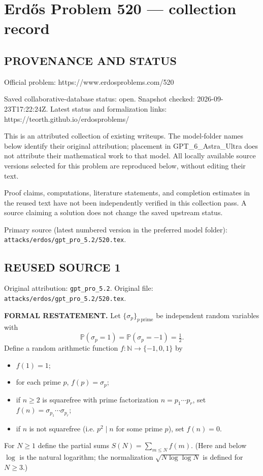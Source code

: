 \section*{Erd\H{o}s Problem 520 --- collection record}

\subsection*{PROVENANCE AND STATUS}
Official problem: https://www.erdosproblems.com/520

Saved collaborative-database status: open.
Snapshot checked: 2026-09-23T17:22:24Z.
Latest status and formalization links: https://teorth.github.io/erdosproblems/

This is an attributed collection of existing writeups. The model-folder names below identify their original attribution; placement in GPT\_6\_Astra\_Ultra does not attribute their mathematical work to that model. All locally available source versions selected for this problem are reproduced below, without editing their text.

Proof claims, computations, literature statements, and completion estimates in the reused text have not been independently verified in this collection pass. A source claiming a solution does not change the saved upstream status.

Primary source (latest numbered version in the preferred model folder): \texttt{attacks/erdos/gpt\_pro\_5.2/520.tex}.

\subsection*{REUSED SOURCE 1}
Original attribution: \texttt{gpt\_pro\_5.2}.
Original file: \texttt{attacks/erdos/gpt\_pro\_5.2/520.tex}.


\noindent\textbf{FORMAL RESTATEMENT.}
Let $\{\sigma_p\}_{p\ \text{prime}}$ be independent random variables with
\[\mathbb P(\sigma_p=1)=\mathbb P(\sigma_p=-1)=\tfrac12.\]
Define a random arithmetic function $f:\mathbb N\to\{-1,0,1\}$ by
\begin{itemize}
\item $f(1)=1$;
\item for each prime $p$, $f(p)=\sigma_p$;
\item if $n\ge 2$ is squarefree with prime factorization $n=p_1\cdots p_r$, set $f(n)=\sigma_{p_1}\cdots \sigma_{p_r}$;
\item if $n$ is not squarefree (i.e. $p^2\mid n$ for some prime $p$), set $f(n)=0$.
\end{itemize}
For $N\ge 1$ define the partial sums $S(N)=\sum_{m\le N} f(m)$. (Here and below $\log$ is the natural logarithm; the normalization $\sqrt{N\log\log N}$ is defined for $N\ge 3$.)

